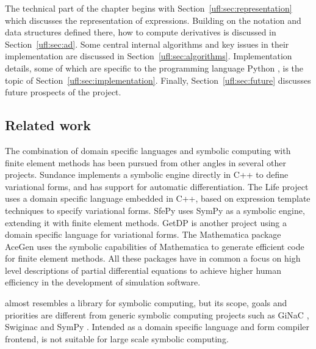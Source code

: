 The technical part of the chapter begins with
Section~\ref{ufl:sec:representation} which discusses the
representation of expressions.  Building on the notation and
data structures defined there, how to compute derivatives is
discussed in Section~\ref{ufl:sec:ad}.  Some central internal
algorithms and key issues in their implementation are discussed in
Section~\ref{ufl:sec:algorithms}.  Implementation details, some of which
are specific to the programming language Python \citep{Rossumothers},
is the topic of Section~\ref{ufl:sec:implementation}.  Finally,
Section~\ref{ufl:sec:future} discusses future prospects of the \ufl{}
project.

\subsection{Related work} \label{ufl:sec:related}

The combination of domain specific languages and symbolic computing
with finite element methods has been pursued from other angles in
several other projects.  Sundance \citep{Long2003,Long2004a,Long2004}
implements a symbolic engine directly in C++ to define variational
forms, and has support for automatic differentiation.  The Life
\citep{Prudhomme2006a,Prudhomme2006} project uses a domain specific
language embedded in C++, based on expression template techniques to
specify variational forms.  SfePy \citep{Cimrman2008} uses SymPy as a
symbolic engine, extending it with finite element methods.  GetDP
\citep{DularGeuzaine2005} is another project using a domain specific
language for variational forms.  The Mathematica package AceGen
\citep{Korelc1997,Korelc2002} uses the symbolic capabilities of
Mathematica to generate efficient code for finite element methods.
All these packages have in common a focus on high level descriptions
of partial differential equations to achieve higher human efficiency
in the development of simulation software.

\ufl{} almost resembles a library for symbolic computing, but its
scope, goals and priorities are different from generic symbolic
computing projects such as GiNaC \citep{BauerFrinkKreckel2000},
Swiginac \citep{SkavhaugCertik2009} and SymPy \citep{Certikothers2009}.
Intended as a domain specific language and form compiler frontend, \ufl{}
is not suitable for large scale symbolic computing.

